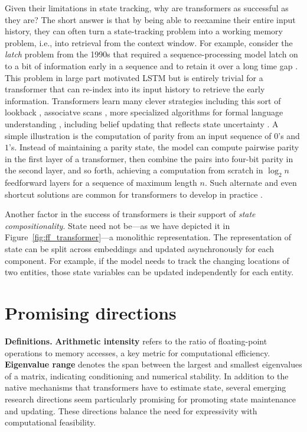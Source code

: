 \documentclass{llmxive}
\begin{document}
Given their limitations in state tracking, why are transformers as successful
as they are? The short answer is that by being able to reexamine their entire input
history, they can often turn a state-tracking problem into a working memory problem, 
i.e., into retrieval from the context window. For example, consider the
\emph{latch} problem from the 1990s that required a sequence-processing model latch
on to a bit of information early in a sequence and to retain it over a long time gap
\citep{mozer1991induction,Bengio1994}. This problem in large part motivated LSTM but is entirely trivial for a transformer that can re-index into its input history to retrieve
the early information. Transformers learn many clever strategies including this
sort of lookback \citep{prakash2026}, associatve scans \citep{li2025},
more specialized algorithms for formal language understanding
\citep{allenzhu2025physicslanguagemodels1,piotrowski2025}, including
belief updating that reflects state uncertainty \citep{shai2024}.
A simple illustration is the computation of parity from an input sequence
of $0$'s and $1$'s. Instead of maintaining a parity state, the model can compute pairwise
parity in the first layer of a transformer, then combine the pairs into four-bit
parity in the second layer, and so forth, achieving a computation from scratch in
$\log_2 n$ feedforward layers for a sequence of maximum length $n$.
Such alternate and even shortcut solutions are common for transformers to develop in practice \citep{liu2022transformers}.

Another factor in the success of transformers is their support of
\emph{state compositionality}.  State need not be---as we have depicted 
it in Figure~\ref{fig:ff_transformer}---a monolithic representation.
The representation of state can be split across embeddings and updated
asynchronously for each component. For example, if the model needs to 
track the changing locations of two entities, those state variables can be updated
independently for each entity.

\section{Promising directions}

\noindent\textbf{Definitions.} \textbf{Arithmetic intensity} refers to the ratio of floating-point operations to memory accesses, a key metric for computational efficiency. \textbf{Eigenvalue range} denotes the span between the largest and smallest eigenvalues of a matrix, indicating conditioning and numerical stability.
In addition to the native mechanisms that transformers have to estimate state, 
several emerging research directions seem particularly promising for promoting
state maintenance and updating. These directions balance the need for 
expressivity with computational feasibility.
\end{document}
